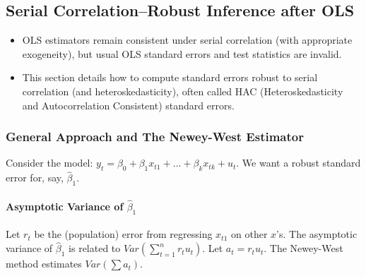 \documentclass[a4paper, 10pt]{article}
\theoremstyle{definition}	%
\begin{document}
\subsection{Serial Correlation–Robust Inference after OLS}

\begin{itemize}
    \item OLS estimators remain consistent under serial correlation (with appropriate exogeneity), but usual OLS standard errors and test statistics are invalid.
    \item This section details how to compute standard errors robust to serial correlation (and heteroskedasticity), often called HAC (Heteroskedasticity and Autocorrelation Consistent) standard errors.
\end{itemize}

\subsubsection{General Approach and The Newey-West Estimator}
Consider the model: \( y_t = \beta_0 + \beta_1 x_{t1} + \dots + \beta_k x_{tk} + u_t \).
We want a robust standard error for, say, \(\hat{\beta}_1\).

\paragraph{Asymptotic Variance of \(\hat{\beta}_1\)}
Let \(r_t\) be the (population) error from regressing \(x_{t1}\) on other \(x\)'s. The asymptotic variance of \(\hat{\beta}_1\) is related to \(Var(\sum_{t=1}^n r_t u_t)\).
Let \(a_t = r_t u_t\). The Newey-West method estimates \(Var(\sum a_t)\).
\end{document}
